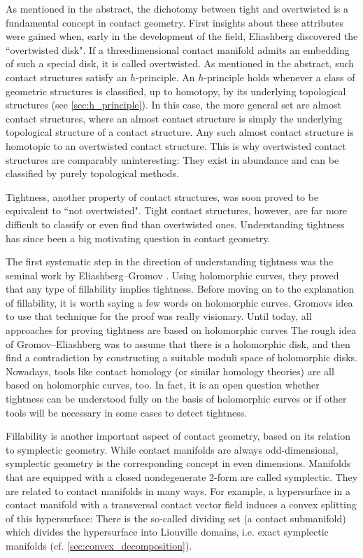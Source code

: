 As mentioned in the abstract, the dichotomy between tight and overtwisted is a fundamental concept in contact geometry.
First insights about these attributes were gained when, early in the development of the field, 
Eliashberg discovered the ``overtwisted disk".
If a threedimensional contact manifold admits an embedding of such a special disk, it is called overtwisted.
As mentioned in the abstract, such contact structures satisfy an $h$-principle.
An $h$-principle holds whenever a class of geometric structures is classified, 
up to homotopy, by its underlying topological structures (see \cref{sec:h_principle}).
In this case, the more general set are almost contact structures, where an almost contact structure
is simply the underlying topological structure of a contact structure.
Any such almost contact structure is homotopic to an overtwisted contact structure.
This is why overtwisted contact structures are comparably uninteresting: They exist
in abundance and can be classified by purely topological methods.

Tightness, another property of contact structures, was soon proved to be equivalent to ``not overtwisted".
Tight contact structures, however, are far more difficult to classify or even find than overtwisted ones.
Understanding tightness has since been a big motivating question in contact geometry.

The first systematic step in the direction of understanding tightness was the seminal work
by Eliashberg--Gromov \cite{Gromov85, Eliashberg91}. Using holomorphic curves, they proved that any type of fillability implies tightness.
Before moving on to the explanation of fillability, it is worth saying a few words on holomorphic curves.
Gromovs idea to use that technique for the proof was really visionary. 
Until today, all approaches for proving tightness are based on holomorphic curves 
The rough idea of Gromov--Eliashberg was to assume that there is a holomorphic disk, 
and then find a contradiction by constructing a suitable moduli space of holomorphic disks.
Nowadays, tools like contact homology (or similar homology theories) are all based on holomorphic curves, too.
In fact, it is an open question whether tightness can be understood fully on the basis of holomorphic curves 
or if other tools will be necessary in some cases to detect tightness.

Fillability is another important aspect of contact geometry, based on its relation to symplectic geometry.
While contact manifolds are always odd-dimensional, symplectic geometry is the corresponding concept in even dimensions.
Manifolds that are equipped with a closed nondegenerate 2-form are called symplectic. They are related
to contact manifolds in many ways.
For example, a hypersurface in a contact manifold with a transversal contact vector field
induces a convex splitting of this hypersurface: There is the so-called dividing set (a contact submanifold)
which divides the hypersurface into Liouville domains, i.e. exact symplectic manifolds (cf. \cref{sec:convex_decomposition}).

